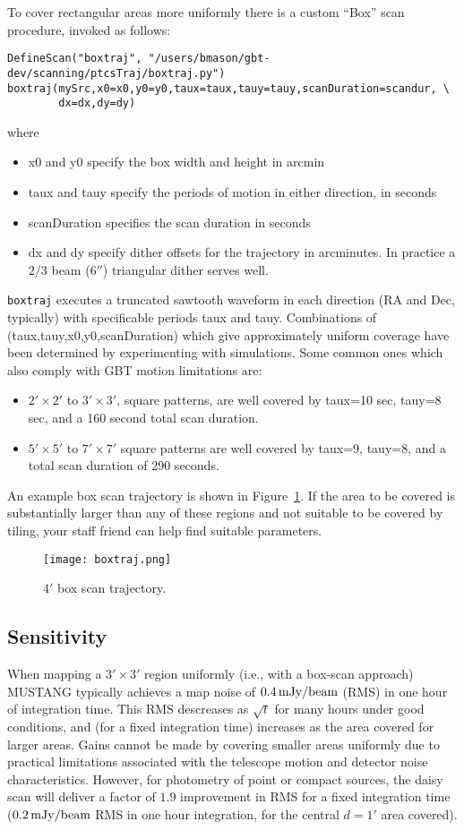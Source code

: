 To cover rectangular areas more uniformly there is a custom ``Box'' scan procedure, invoked
as follows:
\begin{lstlisting}
DefineScan("boxtraj", "/users/bmason/gbt-dev/scanning/ptcsTraj/boxtraj.py")
boxtraj(mySrc,x0=x0,y0=y0,taux=taux,tauy=tauy,scanDuration=scandur, \
        dx=dx,dy=dy)
\end{lstlisting}
where
\begin{itemize}
\item x0 and y0 specify the box width and height in arcmin
\item taux and tauy specify the periods of motion in either direction, in seconds
\item scanDuration specifies the scan duration in seconds
\item dx and dy specify dither offsets for the trajectory in arcminutes. In practice
a $2/3$ beam ($6''$) triangular dither serves well.
\end{itemize}
{\tt boxtraj} executes a truncated sawtooth waveform in each direction (RA and Dec, typically) with 
specificable periods taux and tauy. Combinations of (taux,tauy,x0,y0,scanDuration) which give approximately
uniform coverage have been determined by experimenting with simulations. Some common ones which
also comply with GBT motion limitations are:
\begin{itemize}
\item $2' \times 2'$ to $3' \times 3'$, square patterns, are well covered by taux=10 sec, tauy=8 sec,
and a 160 second total scan duration.
\item $5' \times 5'$ to $7' \times 7'$ square patterns are well covered by taux=9, tauy=8, and a total
scan duration of 290 seconds.
\end{itemize}
An example box scan trajectory is shown in
Figure~\ref{fig:boxtraj}. If the area to be covered is substantially
larger than any of these regions and not suitable to be covered by
tiling, your staff friend can help find suitable parameters.

\begin{figure}
\texttt{[image: boxtraj.png]}
\caption{$4'$ box scan trajectory.}
\label{fig:boxtraj}
\end{figure}


\subsection{Sensitivity}

When mapping a $3' \times 3'$ region uniformly (i.e., with a box-scan
approach) MUSTANG typically achieves a map noise of $0.4 \, {\rm
mJy/beam}$ (RMS) in one hour of integration time.  This RMS descreases
as $\sqrt{t}$ for many hours under good conditions, and (for a fixed
integration time) increases as the area covered for larger
areas. Gains cannot be made by covering smaller areas uniformly due to
practical limitations associated with the telescope motion and
detector noise characteristics. However, for photometry of point or
compact sources, the daisy scan will deliver a factor of $1.9$
improvement in RMS for a fixed integration time ($0.2 \, {\rm
mJy/beam}$ RMS in one hour integration, for the central $d=1'$ area
covered).

